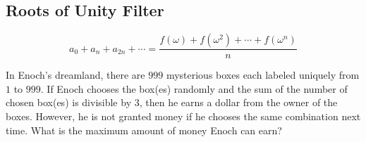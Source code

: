 \documentclass[../../main.tex]{subfiles}
\begin{document}
\subsection{Roots of Unity Filter}

\[
a_0 + a_n + a_{2n} + \cdots
= \frac{f(\omega) + f\left(\omega^2\right) + \cdots +
    f\left(\omega^n\right)
}{n}
\]

\begin{problem}{}{}
In Enoch's dreamland, there are $999$ mysterious boxes each labeled
uniquely from $1$ to $999$. If Enoch chooses the box(es) randomly
and the sum of the number of chosen box(es) is divisible by $3$,
then he earns a dollar from the owner of the boxes. However, he is
not granted money if he chooses the same combination next time.
What is the maximum amount of money Enoch can earn?
\end{problem}
\end{document}
